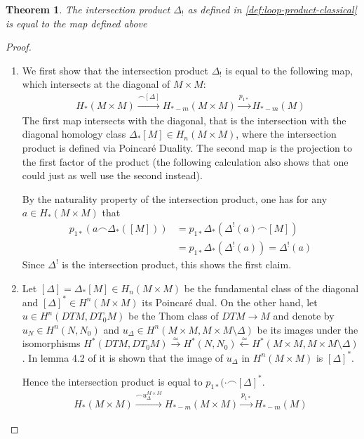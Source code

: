 \documentclass{scrartcl}
\theoremstyle{plain}
\newtheorem{theorem}{Theorem}[section]
\theoremstyle{definition}
\newcommand{\capp}{\mathbin{\frown}}
\newcommand{\quiso}{\simeq}
\let\xto\xrightarrow
\let\xfrom\xleftarrow
\begin{document}
\begin{theorem}\label{thm:intersection_product_tubular}
    The intersection product $\Delta_!$ as defined in \cref{def:loop-product-classical} is equal to the map defined above
\end{theorem}
\begin{proof}
    \begin{enumerate}
        \item We first show that the intersection product $\Delta_!$ is equal to the following map, which intersects at the diagonal of $M\times M$: 
        \begin{align*}
            H_*(M\times M) \xrightarrow{\capp [\Delta]} H_{*-m}(M\times M) \xrightarrow{p_{1*}} H_{*-m}(M)
        \end{align*}
        The first map intersects with the diagonal, that is the intersection with the diagonal homology class $\Delta_*[M]\in H_n(M\times M)$, where the intersection product is defined via Poincaré Duality. The second map is the projection to the first factor of the product (the following calculation also shows that one could just as well use the second instead).

        By the naturality property of the intersection product, one has for any $a\in H_*(M\times M)$ that
        \begin{align*}
            p_{1*}(a \capp \Delta_*([M])) &= p_{1*}\Delta_*(\Delta^!(a) \capp [M]) \\
            &= p_{1*}\Delta_*(\Delta^!(a)) = \Delta^!(a)
        \end{align*}
        Since $\Delta^!$ is the intersection product, this shows the first claim.

        \item Let $[\Delta] = \Delta_*[M]\in H_n(M\times M)$ be the fundamental class of the diagonal and $[\Delta]^*\in H^n(M\times M)$ its Poincaré dual. On the other hand, let $u\in H^n(DTM, DT_0M)$ be the Thom class of $DTM\to M$ and denote by $u_N\in H^n(N, N_0)$ and $u_{\Delta}\in H^n(M\times M, M\times M\setminus\Delta)$ be its images under the isomorphisms $H^*(DTM, DT_0M) \xto{\quiso} H^*(N, N_0) \xfrom{\quiso} H^*(M\times M, M\times M\setminus\Delta)$. In lemma 4.2 of \cite{hutchings2011cup} it is shown that the image of $u_\Delta$ in $H^n(M\times M)$ is $[\Delta]^*$.

        Hence the intersection product is equal to $p_{1*}(\cdot \capp [\Delta]^*$. 
        \begin{align*}
            H_*(M\times M) \xrightarrow{\capp u^{M\times M}_\Delta} H_{*-m}(M\times M) \xrightarrow{p_{1*}} H_{*-m}(M)
        \end{align*}
            


\end{enumerate}
\end{proof}
\end{document}
